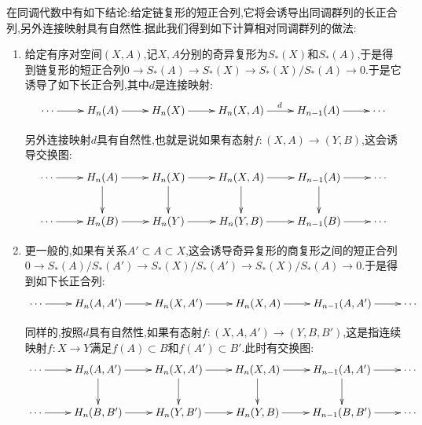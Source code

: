 在同调代数中有如下结论:给定链复形的短正合列,它将会诱导出同调群列的长正合列,另外连接映射具有自然性.据此我们得到如下计算相对同调群列的做法:
\begin{enumerate}
	\item 给定有序对空间$(X,A)$,记$X,A$分别的奇异复形为$S_*(X)$和$S_*(A)$,于是得到链复形的短正合列$0\to S_*(A)\to S_*(X)\to S_*(X)/S_*(A)\to0$.于是它诱导了如下长正合列,其中$d$是连接映射:
	$$\xymatrix{\cdots\ar[r]&H_n(A)\ar[r]&H_n(X)\ar[r]&H_n(X,A)\ar[r]^d&H_{n-1}(A)\ar[r]&\cdots}$$
	
	另外连接映射$d$具有自然性,也就是说如果有态射$f:(X,A)\to(Y,B)$,这会诱导交换图:
	$$\xymatrix{\cdots\ar[r]&H_n(A)\ar[r]\ar[d]&H_n(X)\ar[r]\ar[d]&H_n(X,A)\ar[r]\ar[d]&H_{n-1}(A)\ar[r]\ar[d]&\cdots\\\cdots\ar[r]&H_n(B)\ar[r]&H_n(Y)\ar[r]&H_n(Y,B)\ar[r]&H_{n-1}(B)\ar[r]&\cdots}$$
	\item 更一般的,如果有关系$A'\subset A\subset X$,这会诱导奇异复形的商复形之间的短正合列$0\to S_*(A)/S_*(A')\to S_*(X)/S_*(A')\to S_*(X)/S_*(A)\to0$.于是得到如下长正合列:
	$$\xymatrix{\cdots\ar[r]&H_n(A,A')\ar[r]&H_n(X,A')\ar[r]&H_n(X,A)\ar[r]&H_{n-1}(A,A')\ar[r]&\cdots}$$
	
	同样的,按照$d$具有自然性,如果有态射$f:(X,A,A')\to(Y,B,B')$,这是指连续映射$f:X\to Y$满足$f(A)\subset B$和$f(A')\subset B'$.此时有交换图:
	$$\xymatrix{\cdots\ar[r]&H_n(A,A')\ar[r]\ar[d]&H_n(X,A')\ar[r]\ar[d]&H_n(X,A)\ar[r]\ar[d]&H_{n-1}(A,A')\ar[r]\ar[d]&\cdots\\\cdots\ar[r]&H_n(B,B')\ar[r]&H_n(Y,B')\ar[r]&H_n(Y,B)\ar[r]&H_{n-1}(B,B')\ar[r]&\cdots}$$
\end{enumerate}

